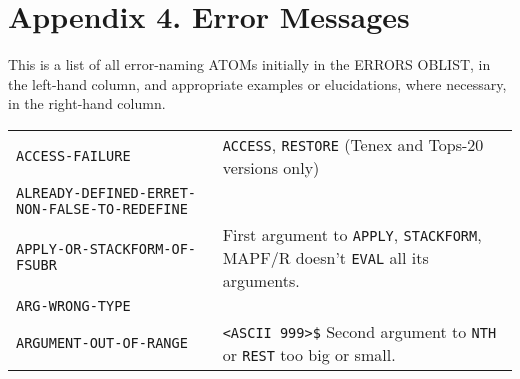 \documentclass[a4paper,]{article}
\begin{document}
\section{Appendix 4. Error Messages}\label{appendix-4.-error-messages}

This is a list of all error-naming ATOMs initially in the ERRORS OBLIST, in the left-hand column, and appropriate examples
or elucidations, where necessary, in the right-hand column.

\begin{longtable}[]{@{}ll@{}}
\toprule
\begin{minipage}[t]{0.58\columnwidth}\raggedright\strut
\texttt{ACCESS-FAILURE}\strut
\end{minipage} & \begin{minipage}[t]{0.36\columnwidth}\raggedright\strut
\texttt{ACCESS}, \texttt{RESTORE} (Tenex and Tops-20 versions only)\strut
\end{minipage}\tabularnewline
\begin{minipage}[t]{0.58\columnwidth}\raggedright\strut
\texttt{ALREADY-DEFINED-ERRET-NON-FALSE-TO-REDEFINE}\strut
\end{minipage} & \begin{minipage}[t]{0.36\columnwidth}\raggedright\strut
\strut
\end{minipage}\tabularnewline
\begin{minipage}[t]{0.58\columnwidth}\raggedright\strut
\texttt{APPLY-OR-STACKFORM-OF-FSUBR}\strut
\end{minipage} & \begin{minipage}[t]{0.36\columnwidth}\raggedright\strut
First argument to \texttt{APPLY}, \texttt{STACKFORM}, MAPF/R doesn't \texttt{EVAL} all its arguments.\strut
\end{minipage}\tabularnewline
\begin{minipage}[t]{0.58\columnwidth}\raggedright\strut
\texttt{ARG-WRONG-TYPE}\strut
\end{minipage} & \begin{minipage}[t]{0.36\columnwidth}\raggedright\strut
\strut
\end{minipage}\tabularnewline
\begin{minipage}[t]{0.58\columnwidth}\raggedright\strut
\texttt{ARGUMENT-OUT-OF-RANGE}\strut
\end{minipage} & \begin{minipage}[t]{0.36\columnwidth}\raggedright\strut
\texttt{\textless{}ASCII\ 999\textgreater{}\$} Second argument to \texttt{NTH} or \texttt{REST} too big or small.\strut

\end{minipage}
\end{longtable}
\end{document}
